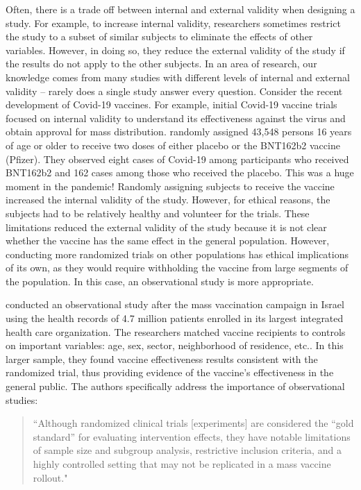 \documentclass[
]{book}
\begin{document}
Often, there is a trade off between internal and external validity when designing a study. For example, to increase internal validity, researchers sometimes restrict the study to a subset of similar subjects to eliminate the effects of other variables. However, in doing so, they reduce the external validity of the study if the results do not apply to the other subjects. In an area of research, our knowledge comes from many studies with different levels of internal and external validity -- rarely does a single study answer every question. Consider the recent development of Covid-19 vaccines. For example, initial Covid-19 vaccine trials focused on internal validity to understand its effectiveness against the virus and obtain approval for mass distribution. \citet{polack2020safety} randomly assigned 43,548 persons 16 years of age or older to receive two doses of either placebo or the BNT162b2 vaccine (Pfizer). They observed eight cases of Covid-19 among participants who received BNT162b2 and 162 cases among those who received the placebo. This was a huge moment in the pandemic! Randomly assigning subjects to receive the vaccine increased the internal validity of the study. However, for ethical reasons, the subjects had to be relatively healthy and volunteer for the trials. These limitations reduced the external validity of the study because it is not clear whether the vaccine has the same effect in the general population. However, conducting more randomized trials on other populations has ethical implications of its own, as they would require withholding the vaccine from large segments of the population. In this case, an observational study is more appropriate.

\citet{dagan2021bnt162b2} conducted an observational study after the mass vaccination campaign in Israel using the health records of 4.7 million patients enrolled in its largest integrated health care organization. The researchers matched vaccine recipients to controls on important variables: age, sex, sector, neighborhood of residence, etc.. In this larger sample, they found vaccine effectiveness results consistent with the randomized trial, thus providing evidence of the vaccine's effectiveness in the general public. The authors specifically address the importance of observational studies:

\begin{quote}
``Although randomized clinical trials {[}experiments{]} are considered the ``gold standard'' for evaluating intervention effects, they have notable limitations of sample size and subgroup analysis, restrictive inclusion criteria, and a highly controlled setting that may not be replicated in a mass vaccine rollout."
\end{quote}
\end{document}
